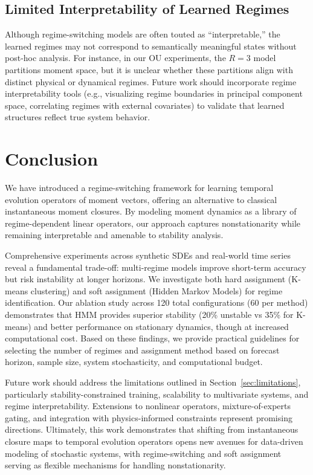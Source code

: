 \documentclass[journal, onecolumn]{IEEEtran}
\begin{document}
\subsection{Limited Interpretability of Learned Regimes}

Although regime-switching models are often touted as ``interpretable,'' the learned regimes may not correspond to semantically meaningful states without post-hoc analysis. For instance, in our OU experiments, the $R=3$ model partitions moment space, but it is unclear whether these partitions align with distinct physical or dynamical regimes. Future work should incorporate regime interpretability tools (e.g., visualizing regime boundaries in principal component space, correlating regimes with external covariates) to validate that learned structures reflect true system behavior.

\section{Conclusion}
\label{sec:conclusion}

We have introduced a regime-switching framework for learning temporal evolution operators of moment vectors, offering an alternative to classical instantaneous moment closures. By modeling moment dynamics as a library of regime-dependent linear operators, our approach captures nonstationarity while remaining interpretable and amenable to stability analysis.

Comprehensive experiments across synthetic SDEs and real-world time series reveal a fundamental trade-off: multi-regime models improve short-term accuracy but risk instability at longer horizons. We investigate both hard assignment (K-means clustering) and soft assignment (Hidden Markov Models) for regime identification. Our ablation study across 120 total configurations (60 per method) demonstrates that HMM provides superior stability (20\% unstable vs 35\% for K-means) and better performance on stationary dynamics, though at increased computational cost. Based on these findings, we provide practical guidelines for selecting the number of regimes and assignment method based on forecast horizon, sample size, system stochasticity, and computational budget.

Future work should address the limitations outlined in Section~\ref{sec:limitations}, particularly stability-constrained training, scalability to multivariate systems, and regime interpretability. Extensions to nonlinear operators, mixture-of-experts gating, and integration with physics-informed constraints represent promising directions. Ultimately, this work demonstrates that shifting from instantaneous closure maps to temporal evolution operators opens new avenues for data-driven modeling of stochastic systems, with regime-switching and soft assignment serving as flexible mechanisms for handling nonstationarity.
\end{document}
